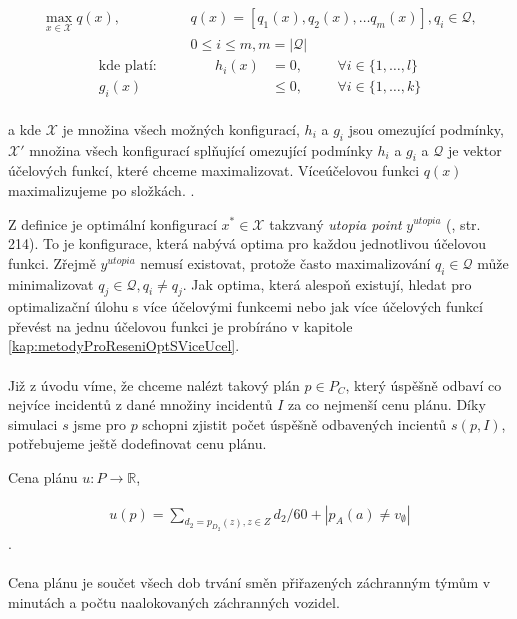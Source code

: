 \begin{definice}
  \begin{align*}
    \max_{x \in \mathcal{X}} q(x), \hspace{50pt} &q(x) = [q_1(x), q_2(x), \dots q_{m}(x)], q_i \in \mathcal{Q}, \\
                                                 &0 \leq i \leq m, m = |\mathcal{Q}| 
  \end{align*}
  \begin{align*}
    \text{kde platí:} \hspace{50pt} h_i(x) &= 0, \hspace{20pt} &\forall i \in \{ 1, \dots, l \} \\
                     g_i(x) &\leq 0, \hspace{20pt} &\forall i \in \{ 1, \dots, k \}
  \end{align*}
  \\
  a kde $\mathcal{X}$ je množina všech možných konfigurací, $h_i$ a $g_i$ jsou omezující podmínky,
  $\mathcal{X}'$ množina všech konfigurací splňující omezující podmínky $h_i$ a $g_i$
  a $\mathcal{Q}$ je vektor účelových funkcí, které chceme maximalizovat.
  Víceúčelovou funkci $q(x)$ maximalizujeme po složkách.
  .
\end{definice}

Z definice je optimální konfigurací $x^* \in \mathcal{X}$ takzvaný \textit{utopia point} $y^{utopia}$ (\citet{AlgOptBook}, str. 214).
To je konfigurace, která nabývá optima pro každou jednotlivou účelovou funkci.
Zřejmě $y^{utopia}$ nemusí existovat, protože často maximalizování $q_i \in \mathcal{Q}$ může minimalizovat $q_j \in \mathcal{Q}, q_i \neq q_j$.
Jak optima, která alespoň existují, hledat pro optimalizační úlohu s více účelovými funkcemi
nebo jak více účelových funkcí převést na jednu účelovou funkci je probíráno v kapitole \ref{kap:metodyProReseniOptSViceUcel}.
\\
\\
Již z úvodu víme, že chceme nalézt takový plán $p \in P_C$, který úspěšně odbaví co nejvíce incidentů z dané množiny incidentů $I$ za co nejmenší cenu plánu.
Díky simulaci $s$ jsme pro $p$ schopni zjistit počet úspěšně odbavených incientů $s(p, I)$, potřebujeme ještě dodefinovat cenu plánu.
\\
\begin{definice}\label{df:cenaPlanu}
  Cena plánu $u \colon P \rightarrow \mathbb{R}$,

  \begin{align*}
    u(p) = \sum_{d_2 = p_{D_2}(z), z \in Z} d_2 / 60 + |p_{A}(a) \neq v_{\emptyset}|
  \end{align*}
  .
  \\
  \\
  Cena plánu je součet všech dob trvání směn přiřazených záchranným týmům v minutách a počtu naalokovaných záchranných vozidel.
\end{definice}

